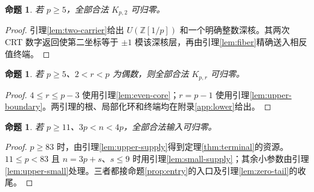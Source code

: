 \documentclass[11pt,a4paper]{article}
\newcommand{\Z}{\mathbb Z}
\newtheorem{proposition}[theorem]{命题}
\theoremstyle{definition}
\numberwithin{equation}{section}
\begin{document}
\begin{proposition}\label{prop:r2}
若 $p\ge5$，全部合法 $K_{p,2}$ 可归零。
\end{proposition}
\begin{proof}
引理\ref{lem:two-carrier}给出 $U(\Z[1/p])$ 和一个明确整数深核。其两次 CRT 数字返回使第二坐标等于 $\pm1$ 模该深核层，再由引理\ref{lem:fiber}精确送入相反值终端。
\end{proof}

\begin{proposition}\label{prop:even}
若 $p\ge5$、$2<r<p$ 为偶数，则全部合法 $K_{p,r}$ 可归零。
\end{proposition}
\begin{proof}
$4\le r\le p-3$ 使用引理\ref{lem:even-core}；$r=p-1$ 使用引理\ref{lem:upper-boundary}。两引理的根、局部化环和终端均在附录\ref{app:lower}给出。
\end{proof}

\begin{proposition}\label{prop:upper}
若 $p\ge11$、$3p<n<4p$，全部合法输入可归零。
\end{proposition}
\begin{proof}
$p\ge83$ 时，由引理\ref{lem:upper-supply}得到定理\ref{thm:terminal}的资源。$11\le p<83$ 且 $n=3p+s$、$s\le9$ 时用引理\ref{lem:small-supply}；其余小参数由引理\ref{lem:upper-small}处理。三者都接命题\ref{prop:entry}的入口及引理\ref{lem:zero-tail}的收尾。
\end{proof}
\end{document}
